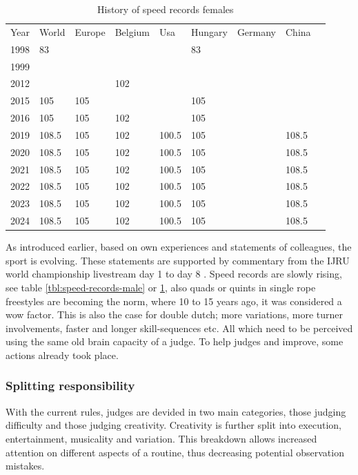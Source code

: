 \begin{table}[]
    \begin{tabular}{lllllllll}
        Year & World & Europe & Belgium & Usa   & Hungary & Germany & China \\
        1998 & 83    &        &         &       & 83      &         &       \\
        1999 &       &        &         &       &         &         &       \\
        2012 &       &        & 102     &       &         &         &       \\
        2015 & 105   & 105    &         &       & 105     &         &       \\
        2016 & 105   & 105    & 102     &       & 105     &         &       \\
        2019 & 108.5 & 105    & 102     & 100.5 & 105     &         & 108.5 \\
        2020 & 108.5 & 105    & 102     & 100.5 & 105     &         & 108.5 \\
        2021 & 108.5 & 105    & 102     & 100.5 & 105     &         & 108.5 \\
        2022 & 108.5 & 105    & 102     & 100.5 & 105     &         & 108.5 \\
        2023 & 108.5 & 105    & 102     & 100.5 & 105     &         & 108.5 \\
        2024 & 108.5 & 105    & 102     & 100.5 & 105     &         & 108.5
    \end{tabular}
    \caption{History of speed records females}
    \label{tbl:speed-records-female}
\end{table}

As introduced earlier, based on own experiences and statements of colleagues, the sport is evolving. These statements are supported by commentary from the IJRU world championship livestream day 1 \autocite{IJRU_yt_2023_livestream_day1} to day 8 \autocite{IJRU_yt_2023_livestream_day8}.
Speed records are slowly rising, see table \ref{tbl:speed-records-male} or \ref{tbl:speed-records-female}, also quads or quints in single rope freestyles are becoming the norm, where 10 to 15 years ago, it was considered a wow factor. This is also the case for double dutch; more variations, more turner involvements, faster and longer skill-sequences etc.
All which need to be perceived using the same old brain capacity of a judge.
To help judges and improve, some actions already took place.

\subsubsection{Splitting responsibility}
With the current rules, judges are devided in two main categories, those judging difficulty and those judging creativity. Creativity is further split into execution, entertainment, musicality and variation. This breakdown allows increased attention on different aspects of a routine, thus decreasing potential observation mistakes.

